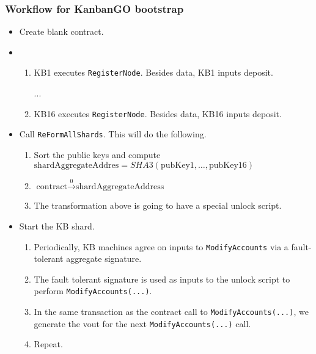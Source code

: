 \begin{frame}[fragile]
\frametitle{Workflow for KanbanGO bootstrap}

\begin{itemize}
\item Create blank contract.
\item \begin{enumerate}
\item KB1 executes \verb|RegisterNode|. Besides data, KB1 inputs deposit.

...

\item KB16 executes \verb|RegisterNode|.  Besides data, KB16 inputs deposit.
\end{enumerate}
\item Call \verb|ReFormAllShards|. This will do the following.
\begin{enumerate}
\item Sort the public keys and compute $ \text{shardAggregateAddres} = SHA3(\text{pubKey1},\dots, \text{pubKey16})$
\item $\text{contract} \stackrel{0}{\to}\text{shardAggregateAddress} $
\item The transformation above is going to have a special unlock script.
\end{enumerate}
\item Start the KB shard.
\begin{enumerate}
\item Periodically, KB machines agree on inputs to \verb|ModifyAccounts| via a fault-tolerant aggregate signature. 
\item The fault tolerant signature is used as inputs to the unlock script to perform \verb|ModifyAccounts(...)|.
\item In the same transaction as the contract call to  \verb|ModifyAccounts(...)|, we generate the vout for the next \verb|ModifyAccounts(...)| call.

\item Repeat.
\end{enumerate}
\end{itemize}

\end{frame}

